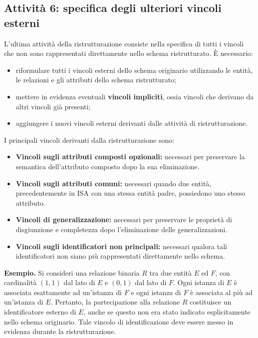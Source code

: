 \subsection{Attività 6: specifica degli ulteriori
vincoli esterni}

L'ultima attività della ristrutturazione consiste
nella specifica di tutti i vincoli che non sono
rappresentati direttamente nello schema
ristrutturato.
È necessario:

\begin{itemize}
    \item riformulare tutti i vincoli esterni
    dello schema originario utilizzando le
    entità, le relazioni e gli attributi dello
    schema ristrutturato;

    \item mettere in evidenza eventuali
    \textbf{vincoli impliciti}, ossia vincoli
    che derivano da altri vincoli già presenti;

    \item aggiungere i nuovi vincoli esterni
    derivanti dalle attività di ristrutturazione.
\end{itemize}

\noindent
I principali vincoli derivanti dalla
ristrutturazione sono:

\begin{itemize}
    \item \textbf{Vincoli sugli attributi
    composti opzionali:} necessari per
    preservare la semantica dell'attributo
    composto dopo la sua eliminazione.

    \item \textbf{Vincoli sugli attributi
    comuni:} necessari quando due entità,
    precedentemente in ISA con una stessa
    entità padre, possiedono uno stesso
    attributo.

    \item \textbf{Vincoli di generalizzazione:}
    necessari per preservare le proprietà
    di disgiunzione e completezza dopo
    l'eliminazione delle generalizzazioni.

    \item \textbf{Vincoli sugli identificatori
    non principali:} necessari qualora tali
    identificatori non siano più rappresentati
    direttamente nello schema.
\end{itemize}
\noindent
\textcolor{verdeEsempio}{\textbf{Esempio. }}
Si consideri una relazione binaria $R$ tra
due entità $E$ ed $F$, con cardinalità
$(1,1)$ dal lato di $E$ e $(0,1)$ dal lato
di $F$.
Ogni istanza di $E$ è associata esattamente
ad un'istanza di $F$ e ogni istanza di $F$
è associata al più ad un'istanza di $E$.
Pertanto, la partecipazione alla relazione
$R$ costituisce un identificatore esterno
di $E$, anche se questo non era stato
indicato esplicitamente nello schema
originario.
Tale vincolo di identificazione deve essere
messo in evidenza durante la ristrutturazione.


